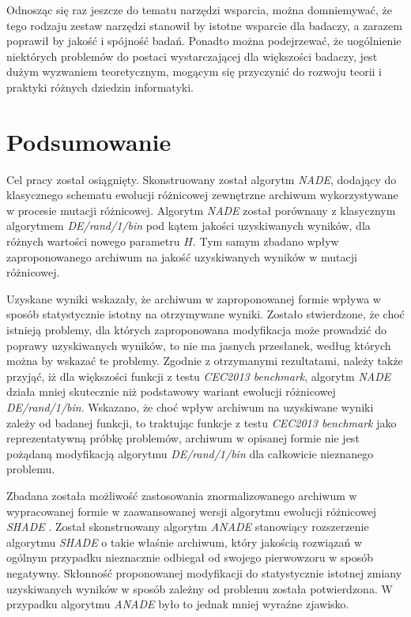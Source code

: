 \documentclass[12pt,a4paper]{report}
\begin{document}
{{{{{{{{\begin{description}
\end{description}
}
\par{
Odnosząc się raz jeszcze do tematu narzędzi wsparcia, można domniemywać, że tego rodzaju zestaw narzędzi stanowił by istotne wsparcie dla badaczy, a zarazem poprawił by jakość i spójność badań. Ponadto można podejrzewać, że uogólnienie niektórych problemów do postaci wystarczającej dla większości badaczy, jest dużym wyzwaniem teoretycznym, mogącym się przyczynić do rozwoju teorii i praktyki różnych dziedzin informatyki.
}


\chapter{Podsumowanie}
\par{
Cel pracy został osiągnięty. Skonstruowany został algorytm \emph{NADE}, dodający do klasycznego schematu ewolucji różnicowej zewnętrzne archiwum wykorzystywane w procesie mutacji różnicowej. Algorytm \emph{NADE} został porównany z klasycznym algorytmem \emph{DE/rand/1/bin} pod kątem jakości uzyskiwanych wyników, dla różnych wartości nowego parametru $H$. Tym samym zbadano wpływ zaproponowanego archiwum na jakość uzyskiwanych wyników w mutacji różnicowej.
}
\par{
Uzyskane wyniki wskazały, że archiwum w zaproponowanej formie wpływa w sposób statystycznie istotny na otrzymywane wyniki. Zostało stwierdzone, że choć istnieją problemy, dla których zaproponowana modyfikacja może prowadzić do poprawy uzyskiwanych wyników, to nie ma jasnych przesłanek, według których można by wskazać te problemy. Zgodnie z otrzymanymi rezultatami, należy także przyjąć, iż dla większości funkcji z testu \emph{CEC2013 benchmark}, algorytm \emph{NADE} działa mniej skutecznie niż podstawowy wariant ewolucji różnicowej \emph{DE/rand/1/bin}. Wskazano, że choć wpływ archiwum na uzyskiwane wyniki zależy od badanej funkcji, to traktując funkcje z testu \emph{CEC2013 benchmark} jako reprezentatywną próbkę problemów, archiwum w opisanej formie nie jest pożądaną modyfikacją algorytmu \emph{DE/rand/1/bin} dla całkowicie nieznanego problemu.
}
\par{
Zbadana została możliwość zastosowania znormalizowanego archiwum w wypracowanej formie w zaawansowanej wersji algorytmu ewolucji różnicowej \emph{SHADE} \cite{SHADE}. Został skonstruowany algorytm \emph{ANADE} stanowiący rozszerzenie algorytmu \emph{SHADE} o takie właśnie archiwum, który jakością rozwiązań w ogólnym przypadku nieznacznie odbiegał od swojego pierwowzoru w sposób negatywny. Skłonność proponowanej modyfikacji do statystycznie istotnej zmiany uzyskiwanych wyników w sposób zależny od problemu została potwierdzona. W przypadku algorytmu \emph{ANADE} było to jednak mniej wyraźne zjawisko.
}}}}}}}}
\end{document}
